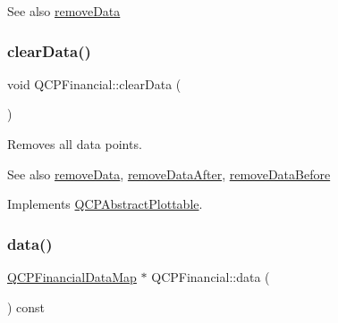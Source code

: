 \begin{DoxySeeAlso}{See also}
\mbox{\hyperlink{class_q_c_p_financial_a048c741d3c8cc5709c2c44b759fdf27c}{remove\+Data}} 
\end{DoxySeeAlso}
\mbox{\label{class_q_c_p_financial_a11fd49928c33e55e27b7319c6927864a}} 
\subsubsection{\texorpdfstring{clear\+Data()}{clearData()}}
{\footnotesize\ttfamily void Q\+C\+P\+Financial\+::clear\+Data (\begin{DoxyParamCaption}{ }\end{DoxyParamCaption})\hspace{0.3cm}{\ttfamily [virtual]}}

Removes all data points.

\begin{DoxySeeAlso}{See also}
\mbox{\hyperlink{class_q_c_p_financial_a048c741d3c8cc5709c2c44b759fdf27c}{remove\+Data}}, \mbox{\hyperlink{class_q_c_p_financial_aa0fcd357005288c833a230c7874825ba}{remove\+Data\+After}}, \mbox{\hyperlink{class_q_c_p_financial_a097c0383c7c1e9042ca7f93cb439d15a}{remove\+Data\+Before}} 
\end{DoxySeeAlso}


Implements \mbox{\hyperlink{class_q_c_p_abstract_plottable_a86e5b8fd4b6ff4f4084e7ea4c573fc53}{Q\+C\+P\+Abstract\+Plottable}}.

\mbox{\label{class_q_c_p_financial_a528c81578e4f25999a9169127763cfd4}} 
\subsubsection{\texorpdfstring{data()}{data()}}
{\footnotesize\ttfamily \mbox{\hyperlink{qcustomplot_8h_a745c09823fae0974b50beca9bc3b3d7d}{Q\+C\+P\+Financial\+Data\+Map}} $\ast$ Q\+C\+P\+Financial\+::data (\begin{DoxyParamCaption}{ }\end{DoxyParamCaption}) const\hspace{0.3cm}{\ttfamily [inline]}}

